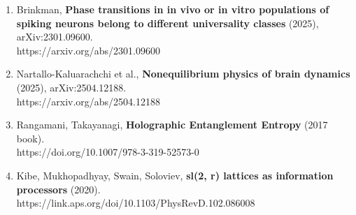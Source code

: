 \documentclass[
]{article}
\begin{document}
\begin{enumerate}
{  neurobiology, models and cognition} (2017), arXiv:1707.05952.\\
  https://arxiv.org/abs/1707.05952
\item
  Brinkman, \textbf{Phase transitions in in vivo or in vitro populations
  of spiking neurons belong to different universality classes} (2025),
  arXiv:2301.09600.\\
  https://arxiv.org/abs/2301.09600
\item
  Nartallo-Kaluarachchi et al., \textbf{Nonequilibrium physics of brain
  dynamics} (2025), arXiv:2504.12188.\\
  https://arxiv.org/abs/2504.12188
\item
  Rangamani, Takayanagi, \textbf{Holographic Entanglement Entropy} (2017
  book).\\
  https://doi.org/10.1007/978-3-319-52573-0
\item
  Kibe, Mukhopadhyay, Swain, Soloviev, \textbf{sl(2, r) lattices as
  information processors} (2020).\\
  https://link.aps.org/doi/10.1103/PhysRevD.102.086008
\end{enumerate}
\end{document}
